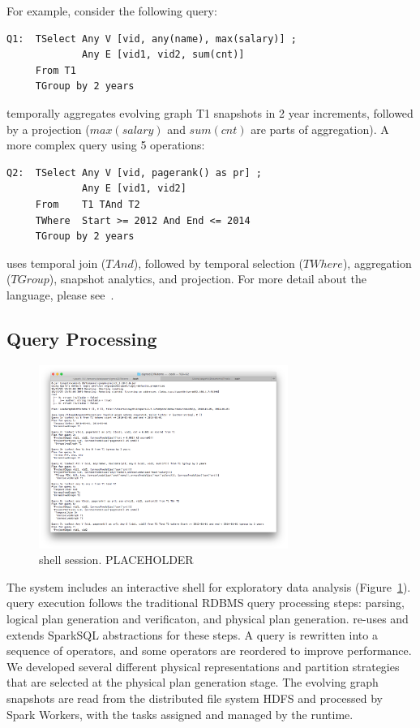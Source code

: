 For example, consider the following query:

\begin{small}
\begin{verbatim}
Q1:  TSelect Any V [vid, any(name), max(salary)] ; 
             Any E [vid1, vid2, sum(cnt)] 
     From T1 
     TGroup by 2 years
\end{verbatim}
\end{small}

 temporally aggregates evolving graph T1 snapshots in 2 year
increments, followed by a projection ($max(salary)$ and $sum(cnt)$ are
parts of aggregation).  A more complex query using 5 operations:

\begin{small}
\begin{verbatim}
Q2:  TSelect Any V [vid, pagerank() as pr] ; 
             Any E [vid1, vid2] 
     From    T1 TAnd T2 
     TWhere  Start >= 2012 And End <= 2014 
     TGroup by 2 years
\end{verbatim}
\end{small}

 uses temporal join ($TAnd$), followed by temporal selection
($TWhere$), aggregation ($TGroup$), snapshot analytics, and
projection.  For more detail about the language, please see~\cite{}.

\subsection{Query Processing}
\label{sec:queryp}

\begin{figure}
\begin{center}
\includegraphics[width=3.2in]{figs/shell.png}
\caption{\ql shell session. PLACEHOLDER}
\label{fig:shell}
\end{center}
\end{figure}

The \ql system includes an interactive shell for exploratory data
analysis (Figure~\ref{fig:shell}).  \ql query execution follows the
traditional RDBMS query processing steps: parsing, logical plan
generation and verificaton, and physical plan generation.  \ql re-uses
and extends SparkSQL abstractions for these steps.  A \ql query is
rewritten into a sequence of operators, and some operators are
reordered to improve performance.  We developed several different
physical representations and partition strategies that are selected at
the physical plan generation stage.  The evolving graph snapshots are
read from the distributed file system HDFS and processed by Spark
Workers, with the tasks assigned and managed by the runtime.


